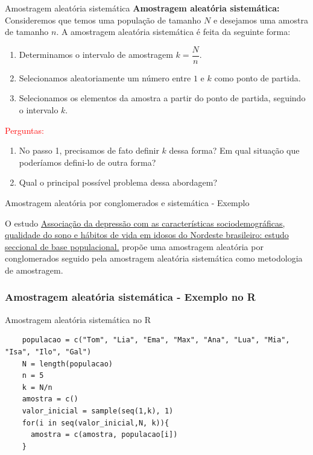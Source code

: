     \begin{frame}{Amostragem aleatória sistemática}
        \textbf{Amostragem aleatória sistemática: }Consideremos que temos uma população de tamanho $N$ e desejamos uma amostra de tamanho $n$.
        A amostragem aleatória sistemática é feita da seguinte forma:
        \begin{enumerate}
            \item Determinamos o intervalo de amostragem $k = \dfrac{N}{n}$.
            \pause
            \item Selecionamos aleatoriamente um número entre $1$ e $k$ como ponto de partida. 
            \pause
            \item Selecionamos os elementos da amostra a partir do ponto de partida, seguindo o intervalo $k$.
        \end{enumerate}
        \pause 
        \textcolor{red}{Perguntas:}
        \begin{enumerate}
            \item  No passo 1, precisamos de fato definir $k$ dessa forma? Em qual situação que poderíamos defini-lo de outra forma?
            \pause
            \item Qual o principal possível problema dessa abordagem?
        \end{enumerate}
       
        \pause

\end{frame}

\begin{frame}{Amostragem aleatória por conglomerados e sistemática - Exemplo}
    \begin{exemplo}
         O estudo \href{https://www.scielo.br/j/rbgg/a/PtkLqMxhrj8b7tQwBVgnr8z/abstract/?lang=pt}{Associação da depressão com as características sociodemográficas, qualidade do sono e hábitos de vida em idosos do Nordeste brasileiro: estudo seccional de base populacional.} 
    propõe uma amostragem aleatória por conglomerados seguido pela amostragem aleatória sistemática como metodologia de amostragem.
    \end{exemplo}
   
\end{frame}

\begin{frame}[fragile] 
\frametitle{Amostragem aleatória sistemática - Exemplo no R}
\begin{block}{Amostragem aleatória sistemática no R}
\begin{verbatim}
    populacao = c("Tom", "Lia", "Ema", "Max", "Ana", "Lua", "Mia", "Isa", "Ilo", "Gal")
    N = length(populacao)
    n = 5
    k = N/n
    amostra = c()
    valor_inicial = sample(seq(1,k), 1)
    for(i in seq(valor_inicial,N, k)){
      amostra = c(amostra, populacao[i])
    }    
\end{verbatim}
\end{block}
\end{frame}  

